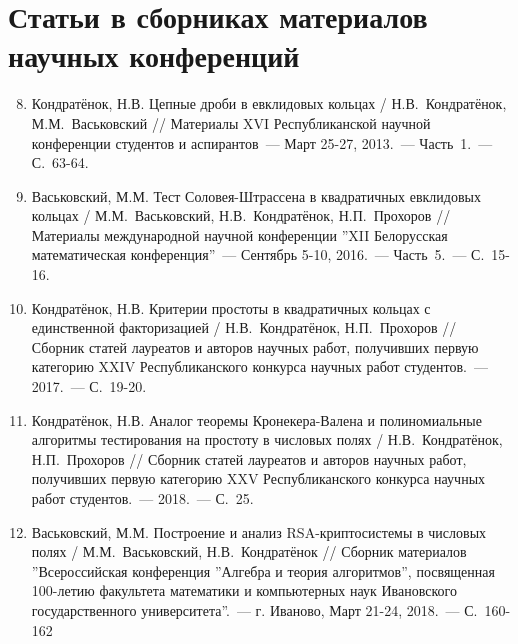 \documentclass[_00_autoref.tex]{subfiles}
\begin{document}
\vspace{-4ex}
\section*{\fontsize{14}{15}\selectfont Статьи в сборниках материалов научных конференций}
\vspace{-4ex}

\begin{enumerate}
\setcounter{enumi}{7}

    \item \label{source:Republican_Scientific_Conference_of_Students_and_Postgraduates_2013}
    Кондратёнок, Н.В. Цепные дроби в евклидовых кольцах / Н.В.~Кондратёнок, М.М.~Васьковский // Материалы XVI Республиканской научной конференции студентов и аспирантов~--- Март 25-27, 2013.~--- Часть~1.~--- С.~63-64.

    \item \label{source:XII_Belarussian_math_conference_2016}
    Васьковский, М.М. Тест Соловея-Штрассена в квадратичных евклидовых кольцах / М.М.~Васьковский, Н.В.~Кондратёнок, Н.П.~Прохоров // Материалы международной научной конференции ''XII Белорусская математическая конференция''~--- Сентябрь 5-10, 2016.~--- Часть~5.~--- С.~15-16.

    \item \label{source:Collection_of_articles_by_laureates_2017}
    Кондратёнок, Н.В. Критерии простоты в квадратичных кольцах с единственной факторизацией / Н.В.~Кондратёнок, Н.П.~Прохоров // Сборник статей лауреатов и авторов научных работ, получивших первую категорию XXIV Республиканского конкурса научных работ студентов.~--- 2017.~--- С.~19-20.

    \item \label{source:Collection_of_articles_by_laureates_2018}
    Кондратёнок, Н.В. Аналог теоремы Кронекера-Валена и полиномиальные алгоритмы тестирования на простоту в числовых полях / Н.В.~Кондратёнок, Н.П.~Прохоров // Сборник статей лауреатов и авторов научных работ, получивших первую категорию XXV Республиканского конкурса научных работ студентов.~--- 2018.~--- С.~25.

    \item \label{source:Algebra_and_theory_of_algorithms}
    Васьковский, М.М. Построение и анализ RSA-криптосистемы в числовых полях / М.М.~Васьковский, Н.В.~Кондратёнок // Сборник материалов ''Всероссийская конференция ''Алгебра и теория алгоритмов'', посвященная 100-летию факультета математики и компьютерных наук Ивановского государственного университета''.~--- г. Иваново, Март 21-24, 2018.~--- С.~160-162


\end{enumerate}
\end{document}
